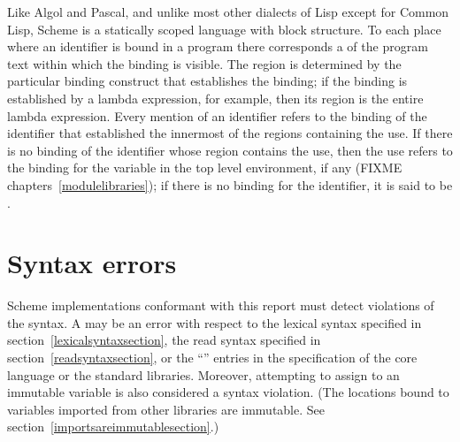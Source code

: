 \vest Like Algol and Pascal, and unlike most other dialects of Lisp
except for Common Lisp, Scheme is a statically scoped language with
block structure.  To each place where an identifier is bound in a program
there corresponds a  of the program text within which
the binding is visible.  The region is determined by the particular
binding construct that establishes the binding; if the binding is
established by a {\cf lambda} expression, for example, then its region
is the entire {\cf lambda} expression.  Every mention of an identifier
refers to the binding of the identifier that established the
innermost of the regions containing the use.  If there is no binding of
the identifier whose region contains the use, then the use refers to the
binding for the variable in the top level environment, if any
(FIXME chapters~\ref{modulelibraries}); if there is no
binding for the identifier,
it is said to be .




\section{Syntax errors}

Scheme implementations conformant with this report must detect
violations of the syntax.  A  may be an error with
respect to the lexical syntax specified in
section~\ref{lexicalsyntaxsection}, the read syntax specified in
section~\ref{readsyntaxsection}, or the ``\exprtype'' entries in the
specification of the core language or the standard libraries.
Moreover, attempting to assign to an immutable variable is also
considered a syntax violation.  (The locations bound to variables
imported from other libraries are immutable.  See
section~\ref{importsareimmutablesection}.)

